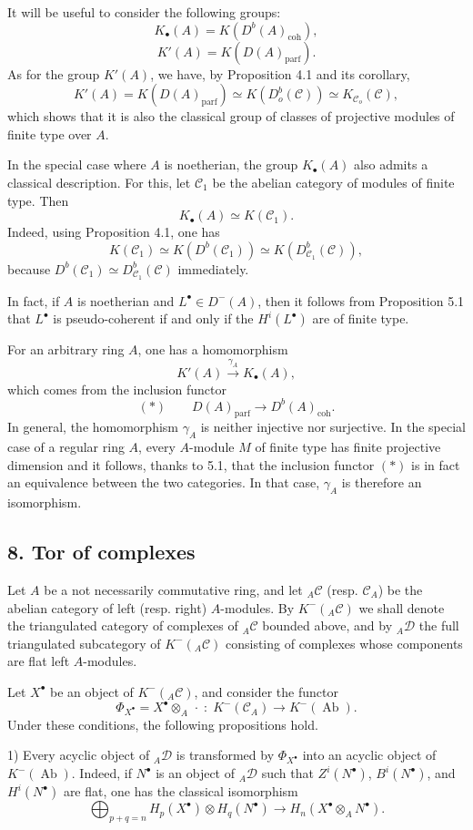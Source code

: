 \documentclass[11pt]{article}
\providecommand{\parf}{\mathrm{parf}}
\providecommand{\coh}{\mathrm{coh}}
\providecommand{\cC}{\mathcal C}
\providecommand{\Ab}{\operatorname{Ab}}
\providecommand{\cC}{\mathcal C}
\providecommand{\cD}{\mathcal D}
\providecommand{\Ab}{\operatorname{Ab}}
\providecommand{\parf}{\mathrm{parf}}
\providecommand{\coh}{\mathrm{coh}}
\begin{document}
It will be useful to consider the following groups:
\[
K_\bullet(A)=K(D^b(A)_{\coh}),
\]
\[
K'(A)=K(D(A)_{\parf}).
\]
As for the group $K'(A)$, we have, by Proposition 4.1 and its corollary,
\[
K'(A)=K(D(A)_{\parf})\simeq K(D_o^b(\cC))\simeq K_{\cC_o}(\cC),
\]
which shows that it is also the classical group of classes of projective modules of finite type over $A$.

In the special case where $A$ is noetherian, the group $K_\bullet(A)$ also admits a classical description. For this, let $\cC_1$ be the abelian category of modules of finite type. Then
\[
K_\bullet(A)\simeq K(\cC_1).
\]
Indeed, using Proposition 4.1, one has
\[
K(\cC_1)\simeq K(D^b(\cC_1))\simeq K(D^b_{\cC_1}(\cC)),
\]
because $D^b(\cC_1)\simeq D^b_{\cC_1}(\cC)$ immediately.

In fact, if $A$ is noetherian and $L^\bullet\in D^-(A)$, then it follows from Proposition 5.1 that $L^\bullet$ is pseudo-coherent if and only if the $H^i(L^\bullet)$ are of finite type.

For an arbitrary ring $A$, one has a homomorphism
\[
K'(A)\xrightarrow{\gamma_A}K_\bullet(A),
\]
which comes from the inclusion functor
\[
(*)\qquad D(A)_{\parf}\longrightarrow D^b(A)_{\coh}.
\]
In general, the homomorphism $\gamma_A$ is neither injective nor surjective. In the special case of a regular ring $A$, every $A$-module $M$ of finite type has finite projective dimension and it follows, thanks to 5.1, that the inclusion functor $(*)$ is in fact an equivalence between the two categories. In that case, $\gamma_A$ is therefore an isomorphism.

\subsection*{8. Tor of complexes}

Let $A$ be a not necessarily commutative ring, and let ${}_A\cC$ (resp. $\cC_A$) be the abelian category of left (resp. right) $A$-modules. By $K^-({}_A\cC)$ we shall denote the triangulated category of complexes of ${}_A\cC$ bounded above, and by ${}_A\cD$ the full triangulated subcategory of $K^-({}_A\cC)$ consisting of complexes whose components are flat left $A$-modules.

Let $X^\bullet$ be an object of $K^-({}_A\cC)$, and consider the functor
\[
\Phi_{X^\bullet}=X^\bullet\otimes_A\,\cdot\;:\;K^-(\cC_A)\longrightarrow K^-(\Ab).
\]
Under these conditions, the following propositions hold.

1) Every acyclic object of ${}_A\cD$ is transformed by $\Phi_{X^\bullet}$ into an acyclic object of $K^-(\Ab)$. Indeed, if $N^\bullet$ is an object of ${}_A\cD$ such that $Z^i(N^\bullet)$, $B^i(N^\bullet)$, and $H^i(N^\bullet)$ are flat, one has the classical isomorphism
\[
\bigoplus_{p+q=n}H_p(X^\bullet)\otimes H_q(N^\bullet)
\longrightarrow H_n(X^\bullet\otimes_A N^\bullet).
\]
\end{document}
